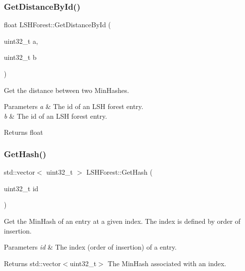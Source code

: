\subsubsection{\texorpdfstring{Get\+Distance\+By\+Id()}{GetDistanceById()}}
{\footnotesize\ttfamily float L\+S\+H\+Forest\+::\+Get\+Distance\+By\+Id (\begin{DoxyParamCaption}\item[{uint32\+\_\+t}]{a,  }\item[{uint32\+\_\+t}]{b }\end{DoxyParamCaption})}



Get the distance between two Min\+Hashes. 


\begin{DoxyParams}{Parameters}
{\em a} & The id of an L\+SH forest entry. \\
\hline
{\em b} & The id of an L\+SH forest entry. \\
\hline
\end{DoxyParams}
\begin{DoxyReturn}{Returns}
float 
\end{DoxyReturn}
\mbox{\label{classLSHForest_aec42a8cb3d1caf12faeb8d0f9ea09529}} 
\subsubsection{\texorpdfstring{Get\+Hash()}{GetHash()}}
{\footnotesize\ttfamily std\+::vector$<$ uint32\+\_\+t $>$ L\+S\+H\+Forest\+::\+Get\+Hash (\begin{DoxyParamCaption}\item[{uint32\+\_\+t}]{id }\end{DoxyParamCaption})}



Get the Min\+Hash of an entry at a given index. The index is defined by order of insertion. 


\begin{DoxyParams}{Parameters}
{\em id} & The index (order of insertion) of a entry. \\
\hline
\end{DoxyParams}
\begin{DoxyReturn}{Returns}
std\+::vector$<$uint32\+\_\+t$>$ The Min\+Hash associated with an index. 
\end{DoxyReturn}
\mbox{\label{classLSHForest_a6c84d67e979b5bfd6123e62e1350dbf2}} 
